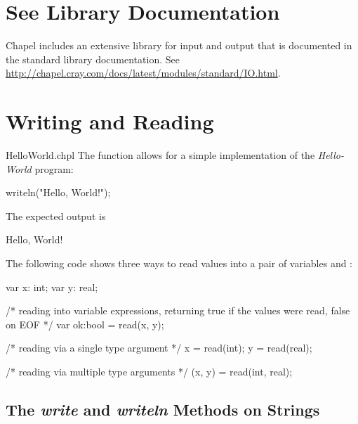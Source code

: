 \label{Input_and_Output}

\section{See Library Documentation}

Chapel includes an extensive library for input and output that is
documented in the standard library documentation. See
\url{http://chapel.cray.com/docs/latest/modules/standard/IO.html}.

\section{Writing and Reading}
\label{IO_writing_reading}

\begin{chapelexample}{HelloWorld.chpl}
The  function allows for a simple implementation
of the {\em Hello-World} program:
\begin{chapel}
writeln("Hello, World!");
\end{chapel}
The expected output is
\begin{chapelprintoutput}{}
Hello, World!
\end{chapelprintoutput}
\end{chapelexample}

\begin{example}
The following code shows three ways to read values into a pair of
variables  and :
\begin{chapel}
var x: int;
var y: real;

/* reading into variable expressions, returning
   true if the values were read, false on EOF */
var ok:bool = read(x, y);

/* reading via a single type argument */
x = read(int);
y = read(real);

/* reading via multiple type arguments */
(x, y) = read(int, real);
\end{chapel}
\end{example}


\subsection{The {\em write} and {\em writeln} Methods on Strings}
\label{stringwrite}


